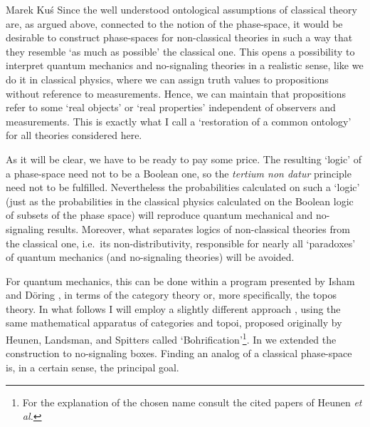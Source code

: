 \begin{artengenv}{Marek Ku\'s}
Since the well understood ontological assumptions of classical theory are, as argued above, connected to the notion of the phase-space, it would be desirable to construct phase-spaces for non-classical theories in such a way that they resemble `as much as possible' the classical one. This opens a possibility to interpret quantum mechanics and no-signaling theories in a realistic sense, like we do it in classical physics, where we can assign truth values to propositions without reference to measurements. Hence, we can maintain that propositions refer to some `real objects' or `real properties' independent of observers and measurements. This is exactly what I call a `restoration of a common ontology' for all theories considered here.    

As it will be clear, we have to be ready to pay some price. The resulting `logic' of a phase-space need not to be a Boolean one, so the \textit{tertium non datur} principle need not to be fulfilled. Nevertheless the probabilities calculated on such a `logic' (just as the probabilities in the classical physics calculated on the Boolean logic of subsets of the phase space) will reproduce quantum mechanical and no-signaling results. Moreover, what separates logics of non-classical theories from the classical one, i.e.\ its non-distributivity, responsible for nearly all `paradoxes' of quantum mechanics (and no-signaling theories) will be avoided.        

For quantum mechanics, this can be done within a program presented by Isham and D\"oring \parencite{doring_topos_2008,doring_topos_2008-1,doring_topos_2008-2,doring_topos_2008-3}, in terms of the category theory or, more specifically, the topos theory. In what follows I will employ a slightly different approach \parencite{wolters_comparison_2013}, using the same mathematical apparatus of categories and topoi, proposed originally by Heunen, Landsman, and Spitters \parencite*{heunen_topos_2009,heunen_gelfand_2011} called `Bohrification'\footnote{For the explanation of the chosen name consult the cited papers of Heunen\textit{ et al.}}. In \parencite{gutt_non-signalling_2016} we extended  the construction  to no-signaling boxes. Finding an analog of a classical phase-space is, in a certain sense, the principal goal. 


\end{artengenv}
